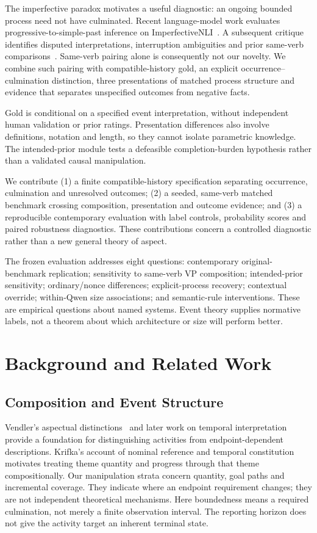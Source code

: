 \documentclass[sigconf,anonymous,review]{acmart}
\begin{document}
The imperfective paradox motivates a useful diagnostic: an ongoing bounded process need not have culminated. Recent language-model work evaluates progressive-to-simple-past inference on ImperfectiveNLI~\cite{ma2026}. A subsequent critique identifies disputed interpretations, interruption ambiguities and prior same-verb comparisons~\cite{han2026}. Same-verb pairing alone is consequently not our novelty. We combine such pairing with compatible-history gold, an explicit occurrence--culmination distinction, three presentations of matched process structure and evidence that separates unspecified outcomes from negative facts.

Gold is conditional on a specified event interpretation, without independent human validation or prior ratings. Presentation differences also involve definitions, notation and length, so they cannot isolate parametric knowledge. The intended-prior module tests a defeasible completion-burden hypothesis rather than a validated causal manipulation.

We contribute (1) a finite compatible-history specification separating occurrence, culmination and unresolved outcomes; (2) a seeded, same-verb matched benchmark crossing composition, presentation and outcome evidence; and (3) a reproducible contemporary evaluation with label controls, probability scores and paired robustness diagnostics. These contributions concern a controlled diagnostic rather than a new general theory of aspect.

The frozen evaluation addresses eight questions: contemporary original-benchmark replication; sensitivity to same-verb VP composition; intended-prior sensitivity; ordinary/nonce differences; explicit-process recovery; contextual override; within-Qwen size associations; and semantic-rule interventions. These are empirical questions about named systems. Event theory supplies normative labels, not a theorem about which architecture or size will perform better.

\section{Background and Related Work}
\subsection{Composition and Event Structure}
Vendler's aspectual distinctions~\cite{vendler1957} and later work on temporal interpretation~\cite{moens1988} provide a foundation for distinguishing activities from endpoint-dependent descriptions. Krifka's account of nominal reference and temporal constitution~\cite{krifka1998} motivates treating theme quantity and progress through that theme compositionally. Our manipulation strata concern quantity, goal paths and incremental coverage. They indicate where an endpoint requirement changes; they are not independent theoretical mechanisms. Here boundedness means a required culmination, not merely a finite observation interval. The reporting horizon does not give the activity target an inherent terminal state.
\end{document}

